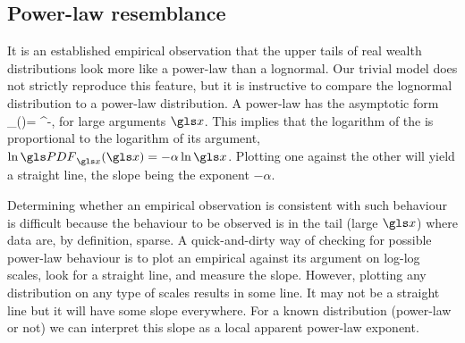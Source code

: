 
\subsection{Power-law resemblance}
It is an established empirical observation \cite{Newman2005} that the upper tails of 
real wealth distributions look more like a power-law than a lognormal. Our trivial model does not
strictly reproduce this feature, but it is instructive to compare the lognormal distribution
to a power-law distribution. A power-law \PDFa has the asymptotic form 
\be
\PDF_\x(\x)= \x^{-\alpha},
\ee
for large arguments $\x$. This implies that the logarithm of the \PDFa is proportional 
to the logarithm of its argument, $\ln \PDF_\x(\x) = -\alpha \ln \x$. Plotting
one against the other will yield a straight line, the slope being the exponent $-\alpha$. 

Determining whether an empirical observation is consistent with such behaviour 
is difficult because the behaviour to be observed is in the tail (large $\x$) where data are,
by definition, sparse. A quick-and-dirty way of checking for possible power-law 
behaviour is to plot an empirical \PDFa against its argument on log-log scales, 
look for a straight line, and measure the slope. However, plotting any distribution on any 
type of scales results in some line. It may not be a straight line but it will have some slope 
everywhere. For a known distribution (power-law or not) we can interpret this slope 
as a local apparent power-law exponent. 


